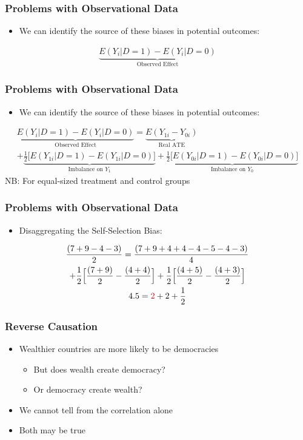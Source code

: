 \documentclass[xcolor=x11names,compress]{beamer}\usepackage[]{graphicx}\usepackage[]{color}
\renewcommand{\(}{\begin{columns}}
\renewcommand{\)}{\end{columns}}
\newcommand{\<}[1]{\begin{column}{#1}}
\renewcommand{\>}{\end{column}}
\begin{document}
\begin{frame}
\frametitle{Problems with Observational Data}
\begin{itemize}
\item We can identify the source of these biases in potential outcomes:
\pause
\end{itemize}
\begin{multline}
\underbrace{E(Y_i|D=1)-E(Y_i|D=0)}_\text{Observed Effect}
\end{multline}
\end{frame}

\begin{frame}
\frametitle{Problems with Observational Data}
\begin{itemize}
\item We can identify the source of these biases in potential outcomes:
\end{itemize}
\begin{multline}
\underbrace{E(Y_i|D=1)-E(Y_i|D=0)}_\text{Observed Effect} = \underbrace{E(Y_{1i} - Y_{0i})}_\text{Real ATE} \\ + \underbrace{\frac{1}{2}\Big[ E(Y_{1i}|D=1) - E(Y_{1i}|D=0) \Big]}_\text{Imbalance on $Y_1$} + \underbrace{\frac{1}{2}\Big[ E(Y_{0i}|D=1) - E(Y_{0i}|D=0) \Big]}_\text{Imbalance on $Y_0$}
\end{multline}
\footnotesize
NB: For equal-sized treatment and control groups
\normalsize
\end{frame}

\begin{frame}
\frametitle{Problems with Observational Data}
\begin{itemize}
\item Disaggregating the Self-Selection Bias:
\end{itemize}
\begin{center}
\begin{multline}
\frac{(7+9-4-3)}{2} = \frac{(7+9+4+4-4-5-4-3)}{4} \\+ \frac{1}{2}\Big[ \frac{(7+9)}{2} - \frac{(4+4)}{2} \Big] + \frac{1}{2} \Big[ \frac{(4+5)}{2}- \frac{(4+3)}{2}\Big] \\
4.5 = \color{red}2 \color{black}+ 2 + \frac{1}{2}
\end{multline}
\end{center}
\end{frame}

\begin{frame}
\frametitle{Reverse Causation}
\begin{itemize}
\item Wealthier countries are more likely to be democracies
\begin{itemize}
\item But does wealth create democracy?
\item Or democracy create wealth?
\end{itemize}
\item We cannot tell from the correlation alone
\item Both may be true
\end{itemize}
\end{frame}
\end{document}
